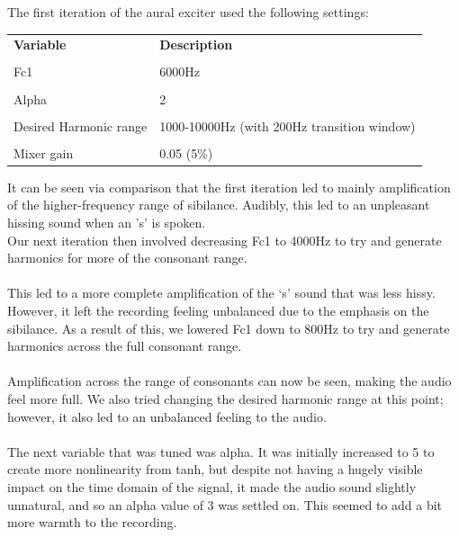 \documentclass[12pt]{extarticle}
\begin{document}
The first iteration of the aural exciter used the following settings: \\
\begin{center}
\begin{tabular}{ | m{7cm}| m{10cm} | } 
  \hline
  \textbf{Variable} & \textbf{Description} \\\\ 
  \hline
  Fc1 & 6000Hz\\\\ 
  \hline
  Alpha & 2 \\\\ 
  \hline
  Desired Harmonic range & 1000-10000Hz (with 200Hz transition window) \\\\
  \hline
  Mixer gain & 0.05 (5\%)\\
  \hline
\end{tabular}
\end{center}

It can be seen via comparison that the first iteration led to mainly amplification of the higher-frequency range of sibilance. Audibly, this led to an unpleasant hissing sound when an 's' is spoken.\\

Our next iteration then involved decreasing Fc1 to 4000Hz to try and generate harmonics for more of the consonant range.\\\\

This led to a more complete amplification of the ‘s’ sound that was less hissy. However, it left the recording feeling unbalanced due to the emphasis on the sibilance. As a result of this, we lowered Fc1 down to 800Hz to try and generate harmonics across the full consonant range.\\\\

Amplification across the range of consonants can now be seen, making the audio feel more full. We also tried changing the desired harmonic range at this point; however, it also led to an unbalanced feeling to the audio.\\\\
The next variable that was tuned was alpha. It was initially increased to 5 to create more nonlinearity from tanh, but despite not having a hugely visible impact on the time domain of the signal, it made the audio sound slightly unnatural, and so an alpha value of 3 was settled on. This seemed to add a bit more warmth to the recording.\\\\
\end{document}
